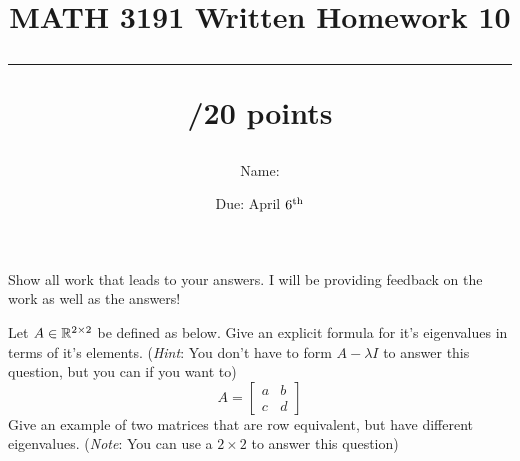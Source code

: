 \documentclass{exam}
\title{MATH 3191 Written Homework 10\\\rule{30pt}{1pt}/20 points}
\author{Name: \rule{150pt}{1pt}}
\date{Due: April $6^\textnormal{th}$}
\newcommand{\bMat}[1]{\begin{bmatrix}#1\end{bmatrix}}
\begin{document}
\maketitle
Show all work that leads to your answers. I will be providing feedback on the work as well as the answers!
\begin{questions}
    \question[10] Let $A\in\mathbb{R}^{2\times 2}$ be defined as below. 
    Give an explicit formula for it's eigenvalues in terms of it's elements. (\emph{Hint}: You don't
    have to form $A-\lambda I$ to answer this question, but you can if you want to)
    \[
        A = \bMat{
            a & b\\
            c & d
        }
    \]
    \newpage
    \question[10] Give an example of two matrices that are row equivalent, but have different eigenvalues.
    (\emph{Note}: You can use a $2\times 2$ to answer this question)
\end{questions}
\end{document}
